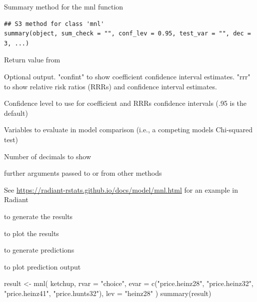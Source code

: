 \documentclass[a4paper]{book}
\begin{document}
%
\begin{Description}
Summary method for the mnl function
\end{Description}
%
\begin{Usage}
\begin{verbatim}
## S3 method for class 'mnl'
summary(object, sum_check = "", conf_lev = 0.95, test_var = "", dec = 3, ...)
\end{verbatim}
\end{Usage}
%
\begin{Arguments}
\begin{ldescription}
\item[\code{object}] Return value from 

\item[\code{sum\_check}] Optional output. "confint" to show coefficient confidence interval estimates. "rrr" to show relative risk ratios (RRRs) and confidence interval estimates.

\item[\code{conf\_lev}] Confidence level to use for coefficient and RRRs confidence intervals (.95 is the default)

\item[\code{test\_var}] Variables to evaluate in model comparison (i.e., a competing models Chi-squared test)

\item[\code{dec}] Number of decimals to show

\item[\code{...}] further arguments passed to or from other methods
\end{ldescription}
\end{Arguments}
%
\begin{Details}
See \url{https://radiant-rstats.github.io/docs/model/mnl.html} for an example in Radiant
\end{Details}
%
\begin{SeeAlso}
 to generate the results

 to plot the results

 to generate predictions

 to plot prediction output
\end{SeeAlso}
%
\begin{Examples}
\begin{ExampleCode}
result <- mnl(
  ketchup,
  rvar = "choice",
  evar = c("price.heinz28", "price.heinz32", "price.heinz41", "price.hunts32"),
  lev = "heinz28"
)
summary(result)

\end{ExampleCode}
\end{Examples}
\end{document}
